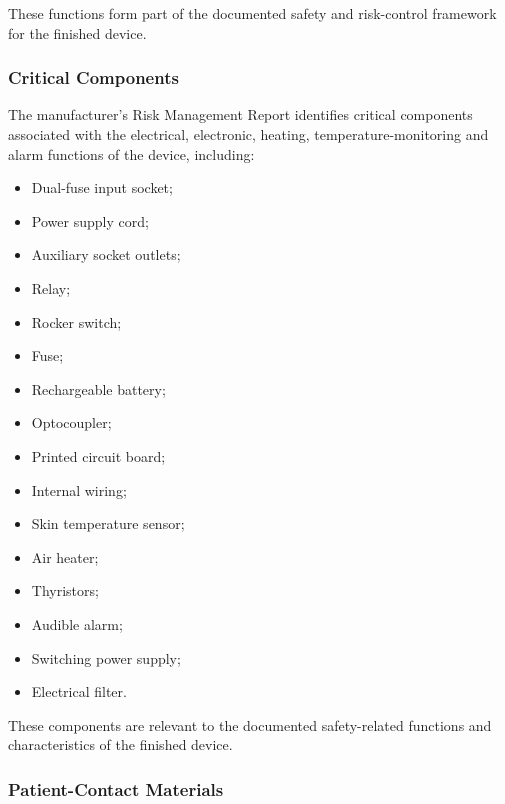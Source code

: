 These functions form part of the documented safety and
risk-control framework for the finished device.


\subsubsection{Critical Components}

The manufacturer's Risk Management Report identifies critical
components associated with the electrical, electronic, heating,
temperature-monitoring and alarm functions of the device,
including:

\begin{itemize}
    \item Dual-fuse input socket;
    \item Power supply cord;
    \item Auxiliary socket outlets;
    \item Relay;
    \item Rocker switch;
    \item Fuse;
    \item Rechargeable battery;
    \item Optocoupler;
    \item Printed circuit board;
    \item Internal wiring;
    \item Skin temperature sensor;
    \item Air heater;
    \item Thyristors;
    \item Audible alarm;
    \item Switching power supply;
    \item Electrical filter.
\end{itemize}

These components are relevant to the documented safety-related
functions and characteristics of the finished device.


\subsubsection{Patient-Contact Materials}

